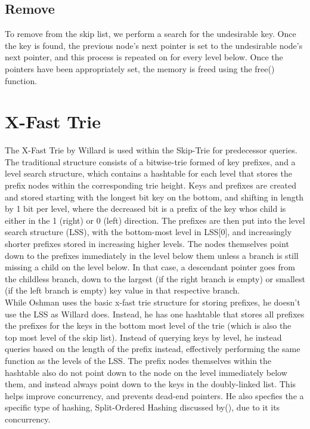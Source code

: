 \documentclass[10pt,twocolumn]{article}
\begin{document}
\subsection{Remove}
	To remove from the skip list, we perform a search for the undesirable key. Once the key is found, the previous node’s next pointer is set to the undesirable node’s next pointer, and this process is repeated on for every level below. Once the pointers have been appropriately set, the memory is freed using the free() function.

\section{X-Fast Trie}
The X-Fast Trie by Willard is used within the Skip-Trie for predecessor queries. The traditional structure consists of a bitwise-trie formed of key prefixes, and a level search structure, which contains a hashtable for each level that stores the prefix nodes within the corresponding trie height.  Keys and prefixes are created and stored starting with the longest bit key on the bottom, and shifting in length by 1 bit per level, where the decreased bit is a prefix of the key whos child is either in the 1 (right) or 0 (left) direction.  The prefixes are then put into the level search structure (LSS), with the bottom-most level in LSS[0], and increasingly shorter prefixes stored in increasing higher levels.  The nodes themselves point down to the prefixes immediately in the level below them unless a branch is still missing a child on the level below.  In that case, a descendant pointer goes from the childless branch, down to the largest (if the right branch is empty) or smallest (if the left branch is empty) key value in that respective branch.\\

While Oshman uses the basic x-fast trie structure for storing prefixes, he doesn't use the LSS as Willard does.  Instead, he has one hashtable that stores all prefixes the prefixes for the keys in the bottom most level of the trie (which is also the top most level of the skip list).  Instead of querying keys by level, he instead queries based on the length of the prefix instead, effectively performing the same function as the levels of the LSS.  The prefix nodes themselves within the hashtable also do not point down to the node on the level immediately below them, and instead always point down to the keys in the doubly-linked list.  This helps improve concurrency, and prevents dead-end pointers. He also specfies the a specific type of hashing, Split-Ordered Hashing discussed by(), due to it its concurrency.  \\
\end{document}
